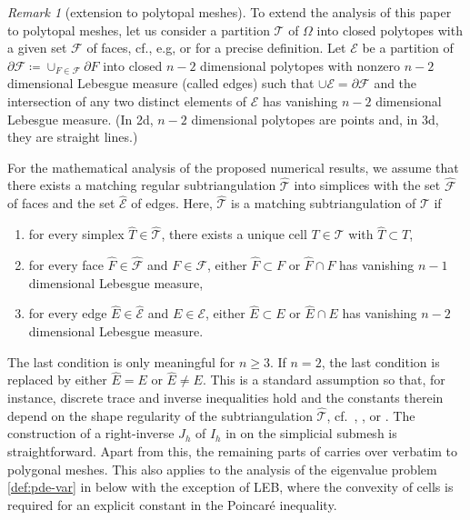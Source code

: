\documentclass[a4paper]{amsart}
\numberwithin{equation}{section}
\theoremstyle{definition}
\theoremstyle{remark}
\newtheorem{remark}[theorem]{Remark}
\numberwithin{theorem}{section}
\numberwithin{equation}{section}
\numberwithin{table}{section}
\numberwithin{figure}{section}
\begin{document}
\begin{remark}[extension to polytopal meshes]\label{rem:polytopal-mesh}
    To extend the analysis of this paper to polytopal meshes, let us consider a partition $\mathcal{T}$ of $\Omega$ into closed polytopes with a given set $\mathcal{F}$ of faces, cf., e.g, \cite[Definition 1.4]{DiPietoDroniou2020} or \cite[Section 1.2.1]{CicuttinErnPignet2021} for a precise definition. Let $\mathcal{E}$ be a partition of $\partial \mathcal{F} \coloneqq \cup_{F \in \mathcal{F}} \partial F$ into closed $n-2$ dimensional polytopes with nonzero $n-2$ dimensional Lebesgue measure (called edges) such that $\cup \mathcal{E} = \partial \mathcal{F}$ and the intersection of any two distinct elements of $\mathcal{E}$ has vanishing $n-2$ dimensional Lebesgue measure. (In 2d, $n-2$ dimensional polytopes are points and, in 3d, they are straight lines.)

    For the mathematical analysis of the proposed numerical results, we assume that there exists a matching regular subtriangulation $\hat{\mathcal{T}}$ into simplices with the set $\hat{\mathcal{F}}$ of faces and the set $\hat{\mathcal{E}}$ of edges. Here, $\hat{\mathcal{T}}$ is a matching subtriangulation of $\mathcal{T}$ if
    \begin{enumerate}
        \item[(a)] for every simplex $\hat{T} \in \hat{\mathcal{T}}$, there exists a unique cell $T \in \mathcal{T}$ with $\hat{T} \subset T$,\\
        \item[(b)] for every face $\hat{F} \in \hat{\mathcal{F}}$ and $F \in \mathcal{F}$, either $\hat{F} \subset F$ or $\hat{F} \cap F$ has vanishing $n-1$ dimensional Lebesgue measure,\\
        \item[(c)] for every edge $\hat{E} \in \hat{\mathcal{E}}$ and $E \in \mathcal{E}$, either $\hat{E} \subset E$ or $\hat{E} \cap E$ has vanishing $n-2$ dimensional Lebesgue measure.
    \end{enumerate}
    The last condition is only meaningful for $n \geq 3$. If $n=2$, the last condition is replaced by either $\hat{E} = E$ or $\hat{E} \neq E$.
    This is a standard assumption so that, for instance, discrete trace and inverse inequalities hold and the constants therein depend on the shape regularity of the subtriangulation $\hat{\mathcal{T}}$, cf.~\cite[Definition 1.37]{DiPietroErn2015}, \cite[Definition 1.8]{DiPietoDroniou2020}, or \cite[Section 2.1.1]{CicuttinErnPignet2021}.
    The construction of a right-inverse $J_h$ of $I_h$ in  on the simplicial submesh is straightforward. Apart from this, the remaining parts of  carries over verbatim to polygonal meshes. This also applies to the analysis of the eigenvalue problem \eqref{def:pde-var} in  below with the exception of LEB, where the convexity of cells is required for an explicit constant in the Poincar\'e inequality.
    

\end{remark}
\end{document}

